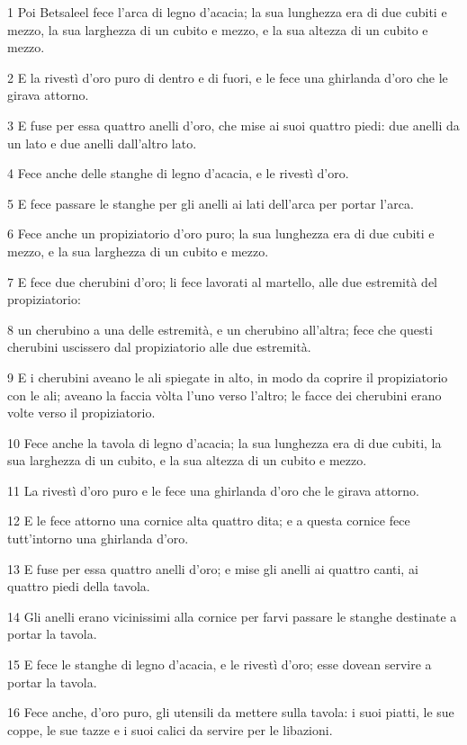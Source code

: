 \par 1 Poi Betsaleel fece l'arca di legno d'acacia; la sua lunghezza era di due cubiti e mezzo, la sua larghezza di un cubito e mezzo, e la sua altezza di un cubito e mezzo.
\par 2 E la rivestì d'oro puro di dentro e di fuori, e le fece una ghirlanda d'oro che le girava attorno.
\par 3 E fuse per essa quattro anelli d'oro, che mise ai suoi quattro piedi: due anelli da un lato e due anelli dall'altro lato.
\par 4 Fece anche delle stanghe di legno d'acacia, e le rivestì d'oro.
\par 5 E fece passare le stanghe per gli anelli ai lati dell'arca per portar l'arca.
\par 6 Fece anche un propiziatorio d'oro puro; la sua lunghezza era di due cubiti e mezzo, e la sua larghezza di un cubito e mezzo.
\par 7 E fece due cherubini d'oro; li fece lavorati al martello, alle due estremità del propiziatorio:
\par 8 un cherubino a una delle estremità, e un cherubino all'altra; fece che questi cherubini uscissero dal propiziatorio alle due estremità.
\par 9 E i cherubini aveano le ali spiegate in alto, in modo da coprire il propiziatorio con le ali; aveano la faccia vòlta l'uno verso l'altro; le facce dei cherubini erano volte verso il propiziatorio.
\par 10 Fece anche la tavola di legno d'acacia; la sua lunghezza era di due cubiti, la sua larghezza di un cubito, e la sua altezza di un cubito e mezzo.
\par 11 La rivestì d'oro puro e le fece una ghirlanda d'oro che le girava attorno.
\par 12 E le fece attorno una cornice alta quattro dita; e a questa cornice fece tutt'intorno una ghirlanda d'oro.
\par 13 E fuse per essa quattro anelli d'oro; e mise gli anelli ai quattro canti, ai quattro piedi della tavola.
\par 14 Gli anelli erano vicinissimi alla cornice per farvi passare le stanghe destinate a portar la tavola.
\par 15 E fece le stanghe di legno d'acacia, e le rivestì d'oro; esse dovean servire a portar la tavola.
\par 16 Fece anche, d'oro puro, gli utensili da mettere sulla tavola: i suoi piatti, le sue coppe, le sue tazze e i suoi calici da servire per le libazioni.
